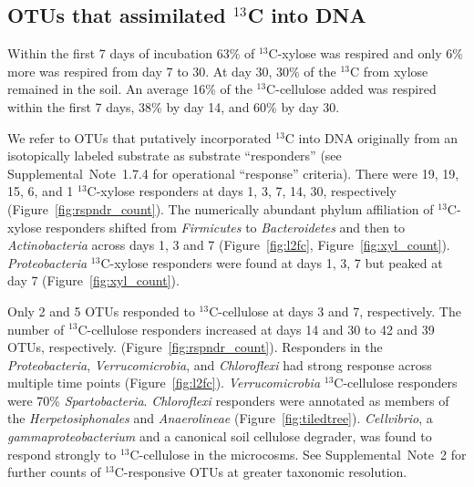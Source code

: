 \subsection{OTUs that assimilated $^{13}$C into DNA} \label{responders}
Within the first 7 days of incubation 63\% of $^{13}$C-xylose was
respired and only 6\% more was respired from day 7 to 30. At day 30, 30\% of
the $^{13}$C from xylose remained in the soil. An average 16\% of the
$^{13}$C-cellulose added was respired within the first 7 days, 38\% by day 14,
and 60\% by day 30.   

We refer to OTUs that putatively incorporated $^{13}$C into DNA originally from
an isotopically labeled substrate as  substrate ``responders'' (see
Supplemental~Note~1.7.4 for operational ``response'' criteria). There were 19,
19, 15, 6, and 1 $^{13}$C-xylose responders at days 1, 3, 7, 14, 30,
respectively (Figure~\ref{fig:rspndr_count}). The numerically abundant phylum
affiliation of $^{13}$C-xylose responders shifted from \textit{Firmicutes} to
\textit{Bacteroidetes} and then to \textit{Actinobacteria} across days 1, 3 and
7 (Figure~\ref{fig:l2fc}, Figure~\ref{fig:xyl_count}). \textit{Proteobacteria}
$^{13}$C-xylose responders were found at days 1, 3, 7 but peaked at day
7 (Figure~\ref{fig:xyl_count}). 

Only 2 and 5 OTUs responded to $^{13}$C-cellulose at days 3 and 7,
respectively. The number of $^{13}$C-cellulose responders increased at days 14
and 30 to 42 and 39 OTUs, respectively. (Figure~\ref{fig:rspndr_count}).
Responders in the \textit{Proteobacteria}, \textit{Verrucomicrobia}, and
\textit{Chloroflexi} had strong response across multiple time points
(Figure~\ref{fig:l2fc}). \textit{Verrucomicrobia} $^{13}$C-cellulose responders
were 70\% \textit{Spartobacteria}. \textit{Chloroflexi} responders were
annotated as members of the \textit{Herpetosiphonales} and
\textit{Anaerolineae} (Figure~\ref{fig:tiledtree}). \textit{Cellvibrio},
a \textit{gammaproteobacterium} and a canonical soil cellulose degrader, was
found to respond strongly to $^{13}$C-cellulose in the microcosms. See
Supplemental~Note~2 for further counts of $^{13}$C-responsive OTUs at greater
taxonomic resolution.

